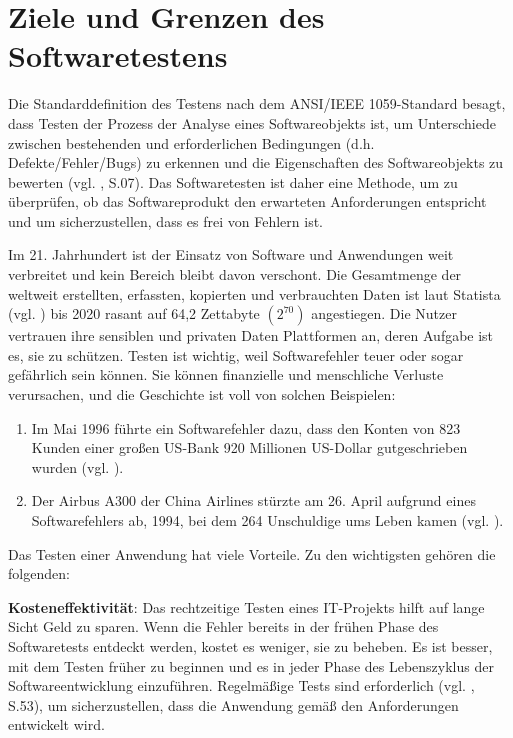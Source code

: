 \section{Ziele und Grenzen des Softwaretestens}

Die Standarddefinition des Testens nach dem
ANSI/IEEE 1059-Standard besagt, dass Testen der
Prozess der Analyse eines Softwareobjekts ist, um
Unterschiede zwischen bestehenden und erforderlichen
Bedingungen (d.h. Defekte/Fehler/Bugs) zu erkennen
und die Eigenschaften des Softwareobjekts zu bewerten (vgl. \cite{singh2012software}, S.07).
Das Softwaretesten ist daher eine Methode, um zu überprüfen,
ob das Softwareprodukt den erwarteten
Anforderungen entspricht und um sicherzustellen, dass
es frei von Fehlern ist.

Im 21. Jahrhundert ist der Einsatz von Software und
Anwendungen weit verbreitet und kein Bereich bleibt
davon verschont. Die Gesamtmenge der weltweit erstellten,
erfassten, kopierten und verbrauchten Daten ist laut
Statista (vgl. \cite{Statista2021}) bis 2020 rasant auf 64,2
Zettabyte \begin{math}(2^{70})\end{math} angestiegen. Die Nutzer vertrauen ihre sensiblen und privaten Daten
Plattformen an, deren Aufgabe ist es, sie zu schützen. Testen
ist wichtig, weil Softwarefehler teuer oder sogar gefährlich
sein können. Sie können finanzielle
und menschliche Verluste verursachen, und die Geschichte
ist voll von solchen Beispielen:

\noindent
\begin{enumerate}
    \item Im Mai 1996 führte ein Softwarefehler dazu, dass
     den Konten von 823 Kunden einer großen US-Bank 920
     Millionen US-Dollar gutgeschrieben wurden (vgl. \cite{Devi2015}).
    \item Der Airbus A300 der China Airlines stürzte am 26. April
    aufgrund eines Softwarefehlers ab, 1994, bei dem 264 Unschuldige
    ums Leben kamen (vgl. \cite{Takeuch1996}).
\end{enumerate}

Das Testen einer Anwendung hat viele Vorteile. Zu den wichtigsten
gehören die folgenden:


 \textbf{Kosteneffektivität}: Das
rechtzeitige Testen eines IT-Projekts hilft auf
lange Sicht Geld zu sparen. Wenn die Fehler bereits in
der frühen Phase des Softwaretests entdeckt werden,
kostet es weniger, sie zu beheben. Es ist besser, mit
dem Testen früher zu beginnen und es in jeder Phase des
Lebenszyklus der Softwareentwicklung einzuführen.
Regelmäßige Tests sind erforderlich (vgl. \cite{kumar2010software}, S.53), um
sicherzustellen, dass die Anwendung gemäß den Anforderungen entwickelt wird.

